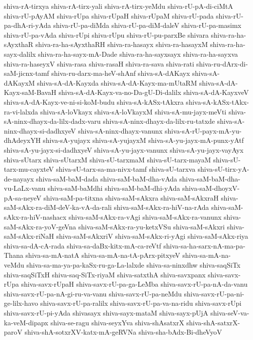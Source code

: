 {shiva-rA-tirxya
shiva-rA-tirx-yali
shiva-rA-tirx-yeMdu
shiva-rU-pA-di-ciMtA
shiva-rU-pAyAM
shiva-rUpa
shiva-rUpaH
shiva-rUpaM
shiva-rU-pada
shiva-rU-pa-dhA-ri-yAda
shiva-rU-pa-diMda
shiva-rU-pa-diM-daleV
shiva-rU-pa-masimx
shiva-rU-pa-vAda
shiva-rUpi
shiva-rUpu
shiva-rU-pu-parxBe
shivara
shiva-ra-ha-sAyxthaR
shiva-ra-ha-sAyxthaRH
shiva-ra-hasayx
shiva-ra-hasayxM
shiva-ra-ha-sayx-dalilx
shiva-ra-ha-sayx-mA-Dade
shiva-ra-ha-sayxsayx
shiva-ra-ha-sayxva
shiva-ra-haseyxV
shiva-rasa
shiva-rasaH
shiva-ra-sava
shiva-rati
shiva-ru-dArx-di-saM-jicnx-tamf
shiva-ru-darx-ma-heV-shAnf
shiva-sA-dAKayx
shiva-sA-dAKayxM
shiva-sA-dA-Kayxda
shiva-sA-dA-Kayx-ma-mUtaRM
shiva-sA-dA-Kayx-saM-BavaH
shiva-sA-dA-Kayx-va-no-Da-gU-Di-dalilx
shiva-sA-dA-KayxveV
shiva-sA-dA-Kayx-ve-ni-si-koM-budu
shiva-sA-kASx-tAkxra
shiva-sA-kASx-tAkx-ra-vi-lalxda
shiva-sA-loVkayx
shiva-sA-loVkayxM
shiva-sA-mu-jayx-meVti
shiva-sA-ninx-dhayx-da-lilx-dadx-varu
shiva-sA-ninx-dhayx-da-lilx-ru-tatxde
shiva-sA-ninx-dhayx-si-dadhxyeV
shiva-sA-ninx-dhayx-vanunx
shiva-sA-rU-payx-mA-yu-dhAdeyxYH
shiva-sA-yujayx
shiva-sA-yujayxM
shiva-sA-yu-jayx-mA-punx-yAtf
shiva-sA-yu-jayx-si-dadhxyeV
shiva-sA-yu-jayx-vanunx
shiva-sA-yu-jayx-vayAyx
shiva-sUtarx
shiva-sUtarxM
shiva-sU-tarxmaM
shiva-sU-tarx-mayaM
shiva-sU-tarx-mu-cayxteV
shiva-sU-tarx-sa-ma-nivx-tamf
shiva-sU-tarxva
shiva-sU-tirx-yA-de-nayayx
shiva-saM-baM-dada
shiva-saM-baM-dha-vAda
shiva-saM-baM-dha-vu-LaLx-vanu
shiva-saM-baMdhi
shiva-saM-baM-dhi-yAda
shiva-saM-dhoyxV-pA-sa-neyeV
shiva-saM-pa-titxna
shiva-saM-sAkxra
shiva-saM-sAkxraH
shiva-saM-sAkx-ra-diM-deV-ka-vA-da-rali
shiva-saM-sAkx-ra-hiV-na-rAda
shiva-saM-sAkx-ra-hiV-nashacx
shiva-saM-sAkx-ra-vAgi
shiva-saM-sAkx-ra-vanunx
shiva-saM-sAkx-ra-yoV-geVna
shiva-saM-sAkx-ra-yu-ketxVSu
shiva-saM-sAkxri
shiva-saM-sAkx-riNaH
shiva-saM-sAkxriV
shiva-saM-sAkx-ri-yAgi
shiva-saM-sAkx-riya
shiva-sa-dA-cA-rada
shiva-sa-daBx-kitx-mA-ca-reVtf
shiva-sa-ha-sarx-nA-ma-pa-Thana
shiva-sa-mA-natA
shiva-sa-mA-na-tA-pArx-pitxyeV
shiva-sa-mA-na-veMdu
shiva-sa-ma-ya-pa-kaSx-ru-ga-La-lalxde
shiva-sa-ninxdhw
shiva-saqSiTx
shiva-saqSiTxH
shiva-saq-SiTx-riyaM
shiva-satxthA
shiva-savxpanx
shiva-savx-rUpa
shiva-savx-rUpaH
shiva-savx-rU-pa-ga-LeMba
shiva-savx-rU-pa-nA-da-vanu
shiva-savx-rU-pa-nA-gi-ru-va-vanu
shiva-savx-rU-pa-neMdu
shiva-savx-rU-pa-ni-ge-lilx-havo
shiva-savx-rU-pa-ralilx
shiva-savx-rU-pa-va-na-ridu
shiva-savx-rUpi
shiva-savx-rU-pi-yAda
shivasayx
shiva-sayx-mataM
shiva-sayx-pUjA
shiva-seV-va-ka-veM-dipapx
shiva-se-ragu
shiva-seyxYva
shiva-shAsatxrX
shiva-shA-satxrX-paroV
shiva-shA-sotxrXV-katx-mA-geRVNa
shiva-sha-bAdx-Bi-dheVyoV
}
